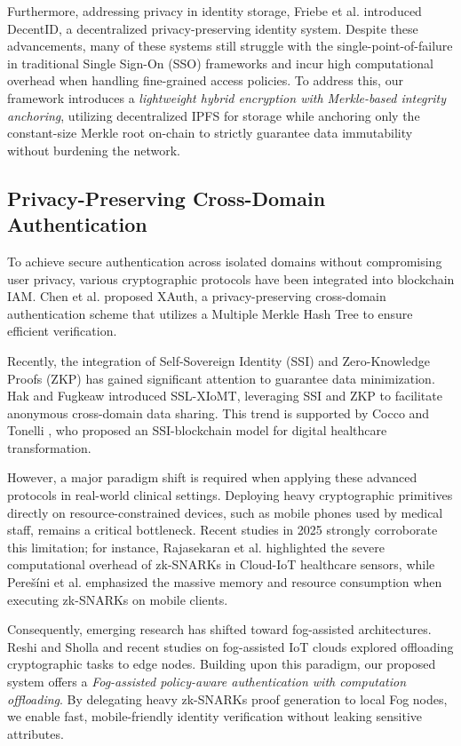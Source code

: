 \documentclass[conference]{IEEEtran}
\begin{document}
Furthermore, addressing privacy in identity storage, Friebe et al. \cite{b13} introduced DecentID, a decentralized privacy-preserving identity system. Despite these advancements, many of these systems still struggle with the single-point-of-failure in traditional Single Sign-On (SSO) frameworks \cite{b14} and incur high computational overhead when handling fine-grained access policies. To address this, our framework introduces a \textit{lightweight hybrid encryption with Merkle-based integrity anchoring}, utilizing decentralized IPFS for storage while anchoring only the constant-size Merkle root on-chain to strictly guarantee data immutability without burdening the network.

\subsection{Privacy-Preserving Cross-Domain Authentication}

To achieve secure authentication across isolated domains without compromising user privacy, various cryptographic protocols have been integrated into blockchain IAM. Chen et al. \cite{b6} proposed XAuth, a privacy-preserving cross-domain authentication scheme that utilizes a Multiple Merkle Hash Tree to ensure efficient verification.
\medskip

Recently, the integration of Self-Sovereign Identity (SSI) and Zero-Knowledge Proofs (ZKP) has gained significant attention to guarantee data minimization. Hak and Fugkeaw \cite{b8} introduced SSL-XIoMT, leveraging SSI and ZKP to facilitate anonymous cross-domain data sharing. This trend is supported by Cocco and Tonelli \cite{b22}, who proposed an SSI-blockchain model for digital healthcare transformation. 
\medskip

However, a major paradigm shift is required when applying these advanced protocols in real-world clinical settings. Deploying heavy cryptographic primitives directly on resource-constrained devices, such as mobile phones used by medical staff, remains a critical bottleneck. Recent studies in 2025 strongly corroborate this limitation; for instance, Rajasekaran et al. \cite{b18} highlighted the severe computational overhead of zk-SNARKs in Cloud-IoT healthcare sensors, while Pere\v{s}\'{i}ni et al. \cite{b19} emphasized the massive memory and resource consumption when executing zk-SNARKs on mobile clients. 
\medskip

Consequently, emerging research has shifted toward fog-assisted architectures. Reshi and Sholla \cite{b23} and recent studies on fog-assisted IoT clouds \cite{b24} explored offloading cryptographic tasks to edge nodes. Building upon this paradigm, our proposed system offers a \textit{Fog-assisted policy-aware authentication with computation offloading}. By delegating heavy zk-SNARKs proof generation to local Fog nodes, we enable fast, mobile-friendly identity verification without leaking sensitive attributes.
\end{document}
